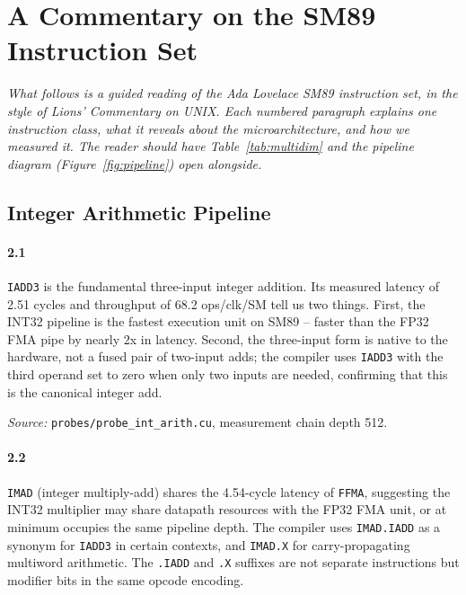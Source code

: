 %
%

\section{A Commentary on the SM89 Instruction Set}

\noindent\textit{%
What follows is a guided reading of the Ada Lovelace SM89 instruction set,
in the style of Lions' Commentary on UNIX.  Each numbered paragraph explains
one instruction class, what it reveals about the microarchitecture, and how
we measured it.  The reader should have Table~\ref{tab:multidim} and the
pipeline diagram (Figure~\ref{fig:pipeline}) open alongside.}

\bigskip

\subsection{Integer Arithmetic Pipeline}
\label{par:int32}

\paragraph{2.1}
\texttt{IADD3} is the fundamental three-input integer addition.  Its measured
latency of 2.51 cycles and throughput of 68.2 ops/clk/SM tell us two things.
First, the INT32 pipeline is the fastest execution unit on SM89 -- faster than
the FP32 FMA pipe by nearly 2x in latency.  Second, the three-input form is
native to the hardware, not a fused pair of two-input adds; the compiler uses
\texttt{IADD3} with the third operand set to zero when only two inputs are
needed, confirming that this is the canonical integer add.

\textit{Source:} \texttt{probes/probe\_int\_arith.cu}, measurement chain depth 512.

\paragraph{2.2}
\texttt{IMAD} (integer multiply-add) shares the 4.54-cycle latency of
\texttt{FFMA}, suggesting the INT32 multiplier may share datapath resources
with the FP32 FMA unit, or at minimum occupies the same pipeline depth.  The
compiler uses \texttt{IMAD.IADD} as a synonym for \texttt{IADD3} in certain
contexts, and \texttt{IMAD.X} for carry-propagating multiword arithmetic.
The \texttt{.IADD} and \texttt{.X} suffixes are not separate instructions but
modifier bits in the same opcode encoding.

